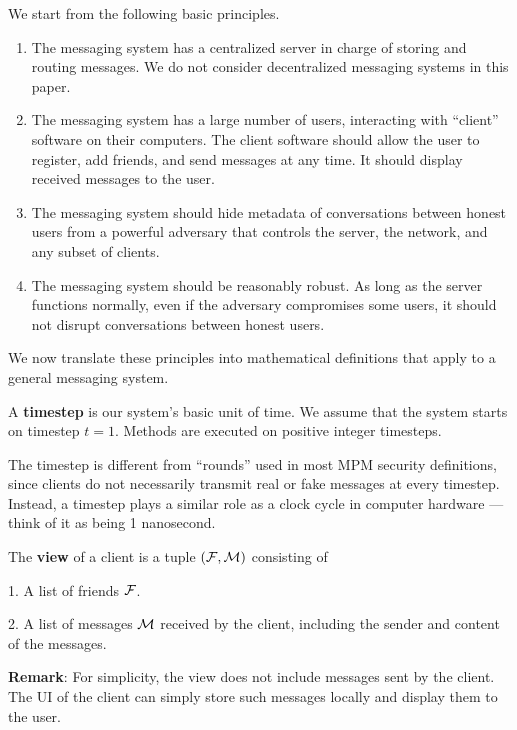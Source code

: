 We start from the following basic principles.
\begin{enumerate}
    \item The messaging system has a centralized server in charge of storing and routing messages. We do not consider decentralized messaging systems in this paper.
    \item The messaging system has a large number of users, interacting with ``client'' software on their computers. The client software should allow the user to register, add friends, and send messages at any time. It should display received messages to the user.
    \item The messaging system should hide metadata of conversations between honest users from a powerful adversary that controls the server, the network, and any subset of clients. 
    \item The messaging system should be reasonably robust. As long as the server functions normally, even if the adversary compromises some users, it should not disrupt conversations between honest users.
\end{enumerate}
We now translate these principles into mathematical definitions that apply to a general messaging system.
\begin{definition}
\label{defn:messaging-timestep}
A \textbf{timestep} is our system's basic unit of time. We assume that the system starts on timestep $t = 1$. Methods are executed on positive integer timesteps.

The timestep is different from ``rounds'' used in most MPM security definitions, since clients do not necessarily transmit real or fake messages at every timestep. Instead, a timestep plays a similar role as a clock cycle in computer hardware — think of it as being 1 nanosecond. 
\end{definition}
\begin{definition}
\label{defn:messaging-client-view}
The \textbf{view} of a client is a tuple $(\mathcal{F}, \mathcal{M})$ consisting of

1. A list of friends $\mathcal{F}$.

2. A list of messages $\mathcal{M}$ received by the client, including the sender and content of the messages.
\end{definition}
\textbf{Remark}: For simplicity, the view does not include messages sent by the client. The UI of the client can simply store such messages locally and display them to the user.
